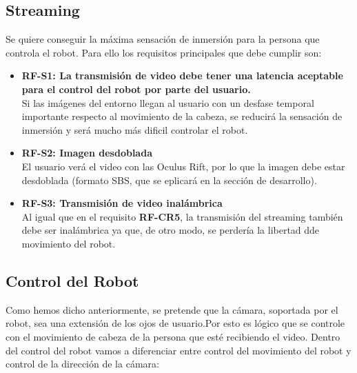 \documentclass[twoside, 11pt]{epstfg}
\begin{document}
\subsection{Streaming}
Se quiere conseguir la máxima sensación de inmersión para la persona que controla el robot.
Para ello los requisitos principales que debe cumplir son:

\begin{itemize}
	\item\textbf{RF-S1: La transmisión de video debe tener una latencia aceptable para el control del robot por parte del usuario.}\\
	Si las imágenes del entorno llegan al usuario con un desfase temporal importante respecto al movimiento de la cabeza, se reducirá la sensación de inmersión y será mucho más dificil controlar el robot.
	
	\item\textbf{RF-S2: Imagen desdoblada}\\
	El usuario verá el video con las Oculus Rift, por lo que la imagen debe estar desdoblada (formato SBS, que se eplicará en la sección de desarrollo).
	
	\item\textbf{RF-S3: Transmisión de video inalámbrica}\\
	Al igual que en el requisito \textbf{RF-CR5}, la transmisión del streaming también debe ser inalámbrica ya que, de otro modo, se perdería la libertad dde movimiento del robot.

	
	
\end{itemize}



\subsection{Control del Robot}

Como hemos dicho anteriormente, se pretende que la cámara, soportada por el robot, sea una extensión de los ojos de usuario.Por esto es lógico que se controle con el movimiento de cabeza de la persona que esté recibiendo el video.
Dentro del control del robot vamos a diferenciar entre control del movimiento del robot y control de la dirección de la cámara:
\end{document}
